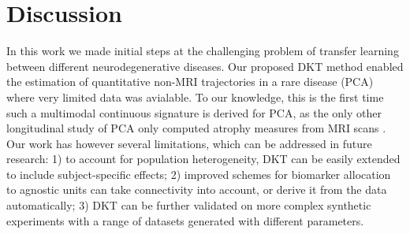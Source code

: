 \documentclass{llncs}
\begin{document}
\section{Discussion}
\label{sec:dktDis}

In this work we made initial steps at the challenging problem of transfer learning between different neurodegenerative diseases. Our proposed DKT method enabled the estimation of quantitative non-MRI trajectories in a rare disease (PCA) where very limited data was avialable. To our knowledge, this is the first time such a multimodal continuous signature is derived for PCA, as the only other longitudinal study of PCA only computed atrophy measures from MRI scans \cite{lehmann2011cortical}. Our work has however several limitations, which can be addressed in future research: 1) to account for population heterogeneity, DKT can be easily extended to include subject-specific effects; 2) improved schemes for biomarker allocation to agnostic units can take connectivity into account, or derive it from the data automatically; 3) DKT can be further validated on more complex synthetic experiments with a range of datasets generated with different parameters.


% 
\end{document}
